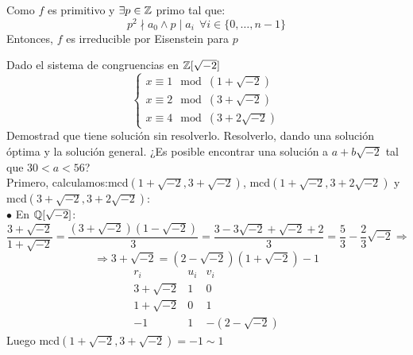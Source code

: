 \documentclass[12pt]{article}
\begin{document}
\begin{ejercicio}[3.5 puntos]
\begin{enumerate}
            \noindent
            Como $f$ es primitivo y $\exists p \in \mathbb{Z}$ primo tal que:
            $$p^2 \nmid a_0 \land p \mid a_i~~\forall i \in \{0, \ldots, n-1\}$$
            Entonces, $f$ es irreducible por Eisenstein para $p$
                
        \end{enumerate}
    \end{ejercicio}

    \begin{ejercicio}[2.5 puntos]
        Dado el sistema de congruencias en $\mathbb{Z}[\sqrt{-2}]$
        $$\left\{ \begin{array}{l}
            x \equiv 1 \mod (1+\sqrt{-2}) \\
            x \equiv 2 \mod (3+\sqrt{-2}) \\
            x \equiv 4 \mod (3+2\sqrt{-2}) 
        \end{array}\right.$$
        Demostrad que tiene solución sin resolverlo. Resolverlo, dando una solución óptima y la solución general. \newline
        ¿Es posible encontrar una solución a $a + b\sqrt{-2}$ tal que $30 < a < 56$?\\

        \noindent
        Primero, calculamos:\newline mcd$(1+\sqrt{-2}, 3+\sqrt{-2})$, mcd$(1+\sqrt{-2}, 3+2\sqrt{-2})$ y mcd$(3+\sqrt{-2}, 3+2\sqrt{-2})$:\\

        \noindent
        $\bullet$ En $\mathbb{Q}[\sqrt{-2}]$:
        $$\dfrac{3+\sqrt{-2}}{1+\sqrt{-2}} = \dfrac{(3+\sqrt{-2})(1-\sqrt{-2})}{3} = \dfrac{3-3\sqrt{-2}+\sqrt{-2}+2}{3} = \dfrac{5}{3} - \dfrac{2}{3}\sqrt{-2} \Rightarrow$$
        $$\Rightarrow 3+\sqrt{-2}=(2-\sqrt{-2})(1+\sqrt{-2})-1$$
        \begin{equation*}
        \begin{array}{rcl}
            r_i & u_i & v_i \\
            3+\sqrt{-2} & 1 & 0 \\
            1+\sqrt{-2} & 0 & 1 \\
            -1 & 1 & -(2-\sqrt{-2})
        \end{array}
        \end{equation*}
        Luego mcd$(1+\sqrt{-2}, 3+\sqrt{-2}) = -1 \sim 1$\\


\end{ejercicio}
\end{document}
